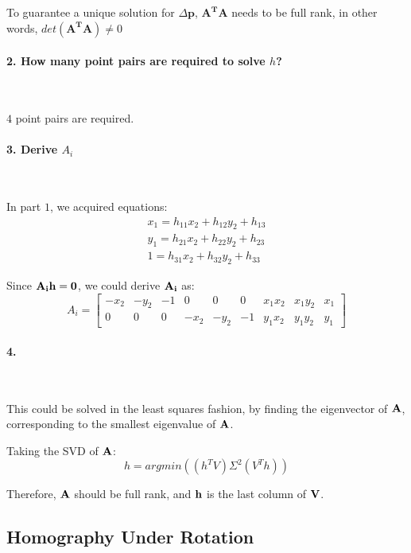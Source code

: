 \documentclass[11pt]{article} \usepackage{fullpage} \usepackage{graphicx} \usepackage{epstopdf} \usepackage{color} \usepackage{psfrag} \usepackage{pdfsync}\usepackage{indentfirst}\usepackage{subfigure}\usepackage{float}\usepackage[section]{placeins}
\begin{document}
To guarantee a unique solution for $\Delta\mathbf{p}$, $\mathbf{A^TA}$ needs to be full rank, in other words, $det\left(\mathbf{A^TA} \right) \ne 0$

\paragraph{2. How many point pairs are required to solve $h$?}~{}

$4$ point pairs are required.

\paragraph{3. Derive $A_i$}~{}

In part $1$, we acquired equations:
\begin{align}
	x_1 = h_{11}x_2 + h_{12}y_2 + h_{13} \\
	y_1 = h_{21}x_2 + h_{22}y_2 + h_{23} \\
	1 = h_{31}x_2 + h_{32}y_2 + h_{33}
\end{align}

Since $\bold{A_ih = 0}$, we could derive $\bold{A_i}$ as:
\begin{equation}
	A_i = 
	\begin{bmatrix}
		-x_2 & -y_2 & -1 & 0 & 0 & 0 & x_1x_2 & x_1y_2 & x_1 \\
		0 & 0 & 0 & -x_2 & -y_2 & -1 & y_1x_2 & y_1y_2 & y_1
	\end{bmatrix}
\end{equation}

\paragraph{4.}~{}

This could be solved in the least squares fashion, by finding the eigenvector of $\bold{A}$, corresponding to the smallest eigenvalue of $\bold{A}$.

Taking the SVD of $\bold{A}$:
\begin{equation}
	h = argmin\left(\left(h^{T}V\right)\Sigma^{2}\left(V^{T}h\right)\right)
\end{equation}

Therefore, $\bold{A}$ should be full rank, and $\bold{h}$ is the last column of $\bold{V}$.

\subsection{Homography Under Rotation}
\end{document}
